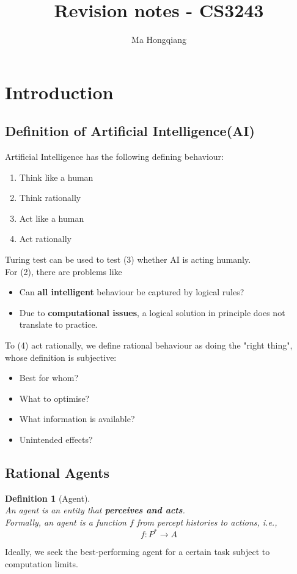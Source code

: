\documentclass[12pt]{article}
\newtheorem{definition}{Definition}[section]
\theoremstyle{definition}
\begin{document}
\title{Revision notes - CS3243}
\author{Ma Hongqiang}
\maketitle
\tableofcontents

\clearpage
\section{Introduction}
\subsection{Definition of Artificial Intelligence(AI)}
Artificial Intelligence has the following defining behaviour:
\begin{enumerate}
	\item Think like a human
	\item Think rationally
	\item Act like a human
	\item Act rationally
\end{enumerate}
Turing test can be used to test (3) whether AI is acting humanly.\\
For (2), there are problems like
\begin{itemize}
	\item Can \textbf{all intelligent} behaviour be captured by logical rules?
	\item Due to \textbf{computational issues}, a logical solution in principle does not translate to practice.
\end{itemize}
To (4) act rationally, we define rational behaviour as doing the "right thing", whose definition is subjective:
\begin{itemize}
	\item Best for whom?
	\item What to optimise?
	\item What information is available?
	\item Unintended effects?
\end{itemize}
\subsection{Rational Agents}
\begin{definition}[Agent]
\hfill\\\normalfont An agent is an entity that \textbf{perceives and acts}.\\Formally, an agent is a function $f$ from percept histories to actions, i.e.,
\[
f:P^\ast\to A
\]
\end{definition}
Ideally, we seek the best-performing agent for a certain task subject to computation limits.
\clearpage
\end{document}
